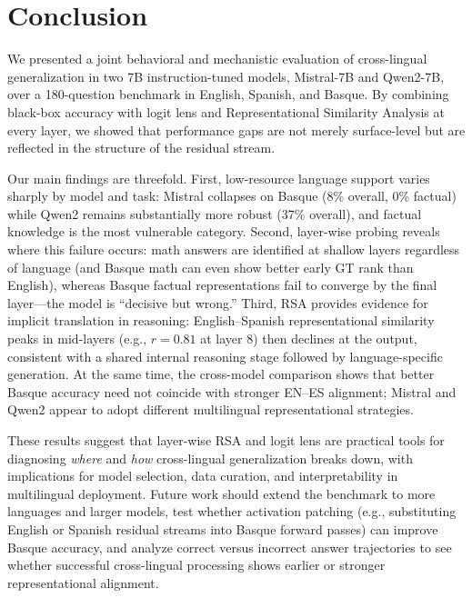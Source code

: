 \documentclass[10pt]{article}
\begin{document}
\section{Conclusion}

We presented a joint behavioral and mechanistic evaluation of cross-lingual generalization in two 7B instruction-tuned models, Mistral-7B and Qwen2-7B, over a 180-question benchmark in English, Spanish, and Basque. By combining black-box accuracy with logit lens and Representational Similarity Analysis at every layer, we showed that performance gaps are not merely surface-level but are reflected in the structure of the residual stream.

Our main findings are threefold. First, low-resource language support varies sharply by model and task: Mistral collapses on Basque (8\% overall, 0\% factual) while Qwen2 remains substantially more robust (37\% overall), and factual knowledge is the most vulnerable category. Second, layer-wise probing reveals where this failure occurs: math answers are identified at shallow layers regardless of language (and Basque math can even show better early GT rank than English), whereas Basque factual representations fail to converge by the final layer---the model is ``decisive but wrong.'' Third, RSA provides evidence for implicit translation in reasoning: English--Spanish representational similarity peaks in mid-layers (e.g., $r = 0.81$ at layer 8) then declines at the output, consistent with a shared internal reasoning stage followed by language-specific generation. At the same time, the cross-model comparison shows that better Basque accuracy need not coincide with stronger EN--ES alignment; Mistral and Qwen2 appear to adopt different multilingual representational strategies.

These results suggest that layer-wise RSA and logit lens are practical tools for diagnosing \emph{where} and \emph{how} cross-lingual generalization breaks down, with implications for model selection, data curation, and interpretability in multilingual deployment. Future work should extend the benchmark to more languages and larger models, test whether activation patching (e.g., substituting English or Spanish residual streams into Basque forward passes) can improve Basque accuracy, and analyze correct versus incorrect answer trajectories to see whether successful cross-lingual processing shows earlier or stronger representational alignment.



\end{document}
